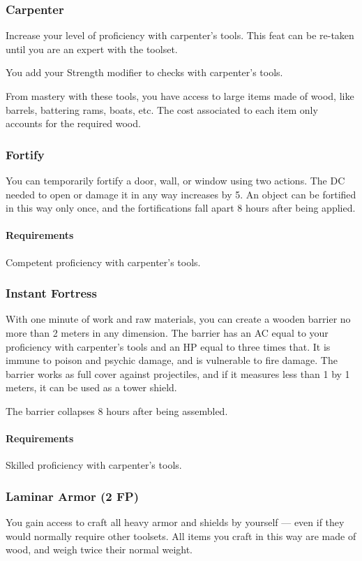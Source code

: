     \subsubsection{Carpenter} \label{feat::carpenter}
        Increase your level of proficiency with carpenter's tools.
        This feat can be re-taken until you are an expert with the toolset.

        You add your Strength modifier to checks with carpenter's tools.

        From mastery with these tools, you have access to large items made of wood, like barrels, battering rams, boats, etc.
        The cost associated to each item only accounts for the required wood.
    \subsubsection{Fortify} \label{feat::fortify}
        You can temporarily fortify a door, wall, or window using two actions.
        The DC needed to open or damage it in any way increases by 5.
        An object can be fortified in this way only once, and the fortifications fall apart 8 hours after being applied.
        \paragraph{Requirements} Competent proficiency with carpenter's tools.
    \subsubsection{Instant Fortress} \label{feat::instantfortress}
        With one minute of work and raw materials, you can create a wooden barrier no more than 2 meters in any dimension.
        The barrier has an AC equal to your proficiency with carpenter's tools and an HP equal to three times that.
        It is immune to poison and psychic damage, and is vulnerable to fire damage.
        The barrier works as full cover against projectiles, and if it measures less than 1 by 1 meters, it can be used as a tower shield.

        The barrier collapses 8 hours after being assembled.
        \paragraph{Requirements} Skilled proficiency with carpenter's tools.
    \subsubsection{Laminar Armor (2 FP)} \label{feat::laminararmor}
        You gain access to craft all heavy armor and shields by yourself --- even if they would normally require other toolsets.
        All items you craft in this way are made of wood, and weigh twice their normal weight.

